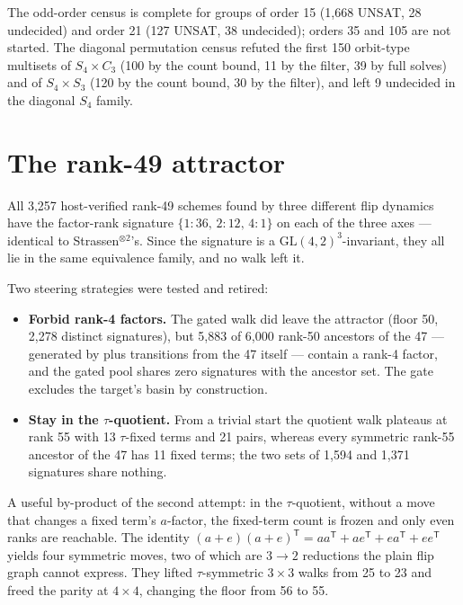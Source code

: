 \documentclass[11pt]{article}
\newcommand{\GL}{\mathrm{GL}}
\begin{document}
The odd-order census is complete for groups of order 15 (1{,}668 UNSAT, 28 undecided) and order 21 (127
UNSAT, 38 undecided); orders 35 and 105 are not started. The diagonal permutation census refuted the
first 150 orbit-type multisets of $S_4\times C_3$ (100 by the count bound, 11 by the filter, 39 by full
solves) and of $S_4\times S_3$ (120 by the count bound, 30 by the filter), and left 9 undecided in the
diagonal $S_4$ family.

\section{The rank-49 attractor}

All 3{,}257 host-verified rank-49 schemes found by three different flip dynamics have the factor-rank
signature $\{1{:}36,\,2{:}12,\,4{:}1\}$ on each of the three axes --- identical to
Strassen$^{\otimes2}$'s. Since the signature is a $\GL(4,2)^3$-invariant, they all lie in the same
equivalence family, and no walk left it.

Two steering strategies were tested and retired:

\begin{itemize}
\item \textbf{Forbid rank-4 factors.} The gated walk did leave the attractor (floor 50, 2{,}278 distinct
signatures), but 5{,}883 of 6{,}000 rank-50 ancestors of the 47 --- generated by plus transitions from the
47 itself --- contain a rank-4 factor, and the gated pool shares zero signatures with the ancestor set.
The gate excludes the target's basin by construction.
\item \textbf{Stay in the $\tau$-quotient.} From a trivial start the quotient walk plateaus at rank 55
with 13 $\tau$-fixed terms and 21 pairs, whereas every symmetric rank-55 ancestor of the 47 has 11 fixed
terms; the two sets of 1{,}594 and 1{,}371 signatures share nothing.
\end{itemize}

A useful by-product of the second attempt: in the $\tau$-quotient, without a move that changes a fixed
term's $a$-factor, the fixed-term count is frozen and only even ranks are reachable. The identity
$(a+e)(a+e)^{\mathsf T} = aa^{\mathsf T} + ae^{\mathsf T} + ea^{\mathsf T} + ee^{\mathsf T}$ yields four
symmetric moves, two of which are $3\to2$ reductions the plain flip graph cannot express. They lifted
$\tau$-symmetric $3\times3$ walks from 25 to 23 and freed the parity at $4\times4$, changing the floor
from 56 to 55.
\end{document}
